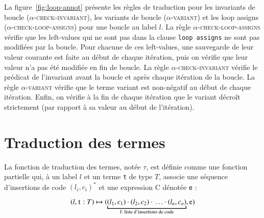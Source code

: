 

La figure~\ref{fig:loop-annot} présente les règles de traduction pour les
invariants de boucle (\textsc{$\alpha$-check-invariant}), les variants de boucle
(\textsc{$\alpha$-variant}) et les loop assigns
(\textsc{$\alpha$-check-loop-assigns}) pour une boucle au label $l$.
La règle \textsc{$\alpha$-check-loop-assigns} vérifie que les left-values qui ne
sont pas dans la clause \lstinline'loop assigns' ne sont pas modifiées par la
boucle.
Pour chacune de ces left-values, une sauvegarde de leur valeur courante est
faite au début de chaque itération, puis on vérifie que leur valeur n'a pas été
modifiée en fin de boucle.
La règle \textsc{$\alpha$-check-invariant} vérifie le prédicat de l'invariant
avant la boucle et après chaque itération de la boucle.
La règle \textsc{$\alpha$-variant} vérifie que le terme variant est non-négatif
au début de chaque itération.
Enfin, on vérifie à la fin de chaque itération que le variant décroît
strictement (par rapport à sa valeur au début de l'itération).



\section{Traduction des termes \eacsl}
\label{sec:term}


La fonction de traduction des termes, notée $\tau$, est définie comme une
fonction partielle qui, à un label $l$ et un terme \lstinline't' de type $T$,
associe une séquence d'insertions de code $(l_i, c_i)^*$ et une expression C
dénotée \lstinline'e' :

\[
(l, \mbox{\lstinline't'}:T) \rulearrow
(\underbracket{(l_1, c_1) \concat (l_2, c_2) \concat \ldots
  \concat (l_n, c_n)}_{I : \text{ liste d'insertions de code}}, \mbox{\lstinline'e'})
\]

